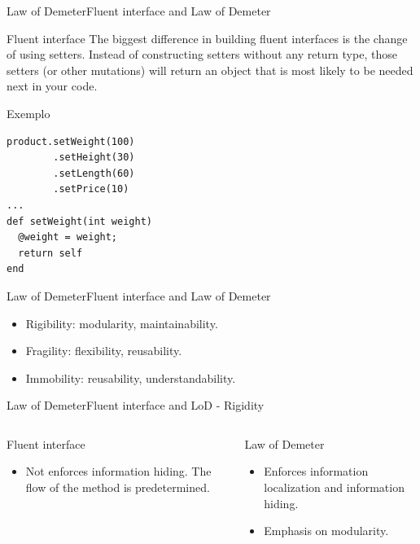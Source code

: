 \documentclass[10pt]{beamer}
\begin{document}
\begin{frame}[fragile]{Law of Demeter}{Fluent interface and Law of Demeter}
  \begin{block}{Fluent interface}
    The biggest difference in building fluent interfaces is the change
      of using setters. Instead of constructing setters without any return type,
      those setters (or other mutations) will return an object that is most
      likely to be needed next in your code.
  \end{block}
Exemplo
\small
\begin{lstlisting}
product.setWeight(100)
        .setHeight(30)
        .setLength(60)
        .setPrice(10)
...
def setWeight(int weight)
  @weight = weight;
  return self
end
\end{lstlisting}

\end{frame}

\begin{frame}{Law of Demeter}{Fluent interface and Law of Demeter}
  \begin{itemize}
    \item Rigibility: modularity, maintainability.
    \item Fragility: flexibility, reusability.
    \item Immobility: reusability, understandability.
  \end{itemize}
\end{frame}

\begin{frame}{Law of Demeter}{Fluent interface and LoD - Rigidity}
  \begin{columns}[T]
      \begin{column}{.5\textwidth}
    Fluent interface
    \begin{itemize}
      \item Not enforces information hiding. The flow of the method is predetermined.
    \end{itemize}
      \end{column}
       \hfill
      \begin{column}{.5\textwidth}
    Law of Demeter
        \begin{itemize}
      \item Enforces information localization and information hiding.
      \item Emphasis on modularity.
    \end{itemize}
      \end{column}
    \end{columns}
\end{frame}
\end{document}
